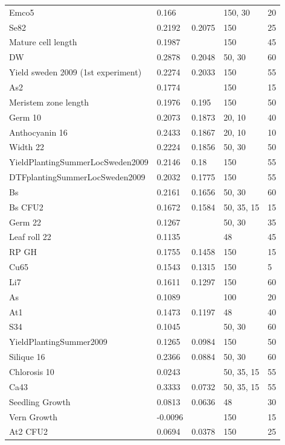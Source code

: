 \begin{longtable}{p{} p{} p{} p{} p{}}
 Emco5 & 0.166 & \color{red}{0.2101} & 150, 30 & 20 \\
 Se82 & 0.2192 & 0.2075 & 150 & 25 \\
 Mature cell length & 0.1987 & \color{red}{0.2052} & 150 & 45 \\
 DW & 0.2878 & 0.2048 & 50, 30 & 60 \\
 Yield sweden 2009 (1st experiment) & 0.2274 & 0.2033 & 150 & 55 \\
 As2 & 0.1774 & \color{red}{0.1962} & 150 & 15 \\
 Meristem zone length & 0.1976 & 0.195 & 150 & 50 \\
 Germ 10 & 0.2073 & 0.1873 & 20, 10 & 40 \\
 Anthocyanin 16 & 0.2433 & 0.1867 & 20, 10 & 10 \\
 Width 22 & 0.2224 & 0.1856 & 50, 30 & 50 \\
 YieldPlantingSummerLocSweden2009 & 0.2146 & 0.18 & 150 & 55 \\
 DTFplantingSummerLocSweden2009 & 0.2032 & 0.1775 & 150 & 55 \\
 Bs & 0.2161 & 0.1656 & 50, 30 & 60 \\
 Bs CFU2 & 0.1672 & 0.1584 & 50, 35, 15 & 15 \\
 Germ 22 & 0.1267 & \color{red}{0.1533} & 50, 30 & 35 \\
 Leaf roll 22 & 0.1135 & \color{red}{0.1511} & 48 & 45 \\
 RP GH & 0.1755 & 0.1458 & 150 & 15 \\
 Cu65 & 0.1543 & 0.1315 & 150 & 5 \\
 Li7 & 0.1611 & 0.1297 & 150 & 60 \\
 As & 0.1089 & \color{red}{0.1227} & 100 & 20 \\
 At1 & 0.1473 & 0.1197 & 48 & 40 \\
 S34 & 0.1045 & \color{red}{0.11} & 50, 30 & 60 \\
 YieldPlantingSummer2009 & 0.1265 & 0.0984 & 150 & 50 \\
 Silique 16 & 0.2366 & 0.0884 & 50, 30 & 60 \\
 Chlorosis 10 & 0.0243 & \color{red}{0.088} & 50, 35, 15 & 55 \\
 Ca43 & 0.3333 & 0.0732 & 50, 35, 15 & 55 \\
 Seedling Growth & 0.0813 & 0.0636 & 48 & 30 \\
 Vern Growth & -0.0096 & \color{red}{0.0422} & 150 & 15 \\
 At2 CFU2 & 0.0694 & 0.0378 & 150 & 25 \\

\end{longtable}
